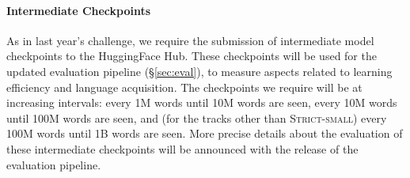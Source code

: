 \documentclass[11pt]{article}
\newcommand{\strictsmall}[1]{\textsc{Strict-small}}
\begin{document}




\paragraph{Intermediate Checkpoints} %
As in last year's challenge, we require the submission of intermediate model checkpoints to the HuggingFace Hub.
These checkpoints will be used for the updated evaluation pipeline (\S\ref{sec:eval}), to measure aspects related to learning efficiency and language acquisition.
The checkpoints we require will be at increasing intervals: every 1M words until 10M words are seen, every 10M words until 100M words are seen, and (for the tracks other than \strictsmall{}) every 100M words until 1B words are seen.
More precise details about the evaluation of these intermediate checkpoints will be announced with the release of the evaluation pipeline.
\end{document}

